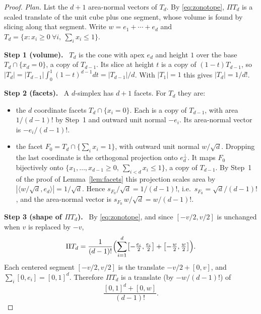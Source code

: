 \documentclass[11pt]{article}
\newcommand{\step}[1]{\par\smallskip\noindent\textbf{#1}\ }
\begin{document}
\begin{proof}
\emph{Plan.} List the \(d+1\) area-normal vectors of \(T_d\). By
\eqref{eq:zonotope}, \(\Pi T_d\) is a scaled translate of the unit cube
plus one segment, whose volume is found by slicing along that segment.
Write \(w=e_1+\cdots+e_d\) and
\(T_d=\{x:x_i\ge0\ \forall i,\ \sum_ix_i\le1\}\).

\step{Step 1 (volume).} \(T_d\) is the cone with apex \(e_d\) and height
\(1\) over the base \(T_d\cap\{x_d=0\}\), a copy of \(T_{d-1}\). Its
slice at height \(t\) is a copy of \((1-t)T_{d-1}\), so
\(|T_d|=|T_{d-1}|\int_0^1(1-t)^{d-1}dt=|T_{d-1}|/d\). With
\(|T_1|=1\) this gives \(|T_d|=1/d!\).

\step{Step 2 (facets).} A \(d\)-simplex has \(d+1\) facets. For \(T_d\)
they are:
\begin{itemize}[nosep,leftmargin=2em]
\item the \(d\) coordinate facets \(T_d\cap\{x_i=0\}\). Each is a copy
 of \(T_{d-1}\), with area \(1/(d-1)!\) by Step~1 and outward unit
 normal \(-e_i\). Its area-normal vector is \(-e_i/(d-1)!\).
\item the facet \(F_0=T_d\cap\{\sum_ix_i=1\}\), with outward unit
 normal \(w/\sqrt d\). Dropping the last coordinate is the orthogonal
 projection onto \(e_d^\perp\). It maps \(F_0\) bijectively onto
 \(\{x_1,\ldots,x_{d-1}\ge0,\ \sum_{i<d}x_i\le1\}\), a copy of
 \(T_{d-1}\). By Step~1 of the proof of Lemma~\ref{lem:facets} this
 projection scales area by
 \(|\langle w/\sqrt d,e_d\rangle|=1/\sqrt d\). Hence
 \(s_{F_0}/\sqrt d=1/(d-1)!\), i.e.\ \(s_{F_0}=\sqrt d/(d-1)!\), and the
 area-normal vector is \(s_{F_0}\,w/\sqrt d=w/(d-1)!\).
\end{itemize}

\step{Step 3 (shape of \(\Pi T_d\)).} By \eqref{eq:zonotope}, and since
\([-v/2,v/2]\) is unchanged when \(v\) is replaced by \(-v\),
\[
 \Pi T_d=\frac1{(d-1)!}\Bigl(\sum_{i=1}^d
 \bigl[-\tfrac{e_i}2,\tfrac{e_i}2\bigr]
 +\bigl[-\tfrac w2,\tfrac w2\bigr]\Bigr).
\]
Each centered segment \([-v/2,v/2]\) is the translate \(-v/2+[0,v]\),
and \(\sum_i[0,e_i]=[0,1]^d\). Therefore \(\Pi T_d\) is a translate (by
\(-w/(d-1)!\)) of
\[
 \frac{[0,1]^d+[0,w]}{(d-1)!}.
\]


\end{proof}
\end{document}
